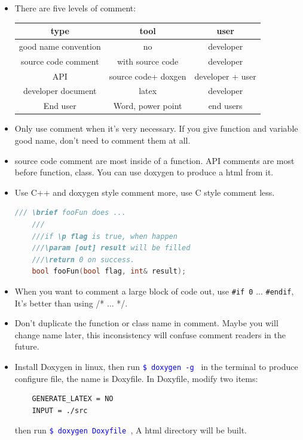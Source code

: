 \documentclass[a4paper,12pt,twoside]{book}
\newcommand{\linuxcommand}[1]{\texttt{\textcolor{blue}{\$ #1 \Pisymbol{psy}{191}}}}
\begin{document}
\begin{itemize}
	\item There are five levels of comment:
	\begin{tabular}{|c|c|c|}
		\hline 
		type & tool & user \\ 
		\hline 
		good name convention & no & developer  \\ 
		\hline 
		source code comment & with source code &  developer \\ 
		\hline 
		API & source code+ doxgen  & developer + user  \\ 
		\hline 
		developer document & latex &  developer \\ 
		\hline 
		End user & Word, power point & end users  \\ 
		\hline 
	\end{tabular} 
	
	\item Only use comment when it's very necessary. If you give function and variable good name, don't need to comment them at all. 
	
	\item source code comment are most inside of a function. API comments are most before function, class. You can use doxygen to produce a html from it. 
	
	\item Use C++ and doxygen style comment more, use C style comment less.
	
	\begin{lstlisting}[frame=single, language=c++]
	/// \brief fooFun does ...
	///
	///if \p flag is true, when happen
	///\param [out] result will be filled
	///\return 0 on success.
	bool fooFun(bool flag, int& result);
	\end{lstlisting}
	
	\item When you want to comment a large block of code out, use \texttt{\#if 0} ...  \texttt{\#endif}, It's better than using /* ... */. 
	
	\item Don't duplicate the function or class name in comment. Maybe you will change name later, this inconsistency will confuse comment readers in the future.
	
	\item Install Doxygen in linux, then run \linuxcommand{doxygen -g} in the terminal to produce configure file, the name is Doxyfile.  In Doxyfile, modify two items:
	\begin{verbatim}
	GENERATE_LATEX = NO
	INPUT = ./src
	\end{verbatim}
	then run \linuxcommand{doxygen Doxyfile}, A html directory will be built.
	

\end{itemize}
\end{document}
